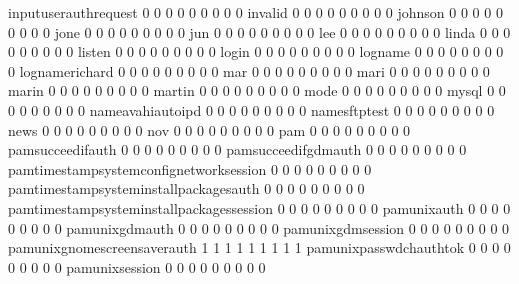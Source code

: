 \documentclass[compress,8pt]{beamer}
\begin{document}
\begin{frame}
\begin{Schunk}
  inputuserauthrequest                       0   0   0   0   0   0   0   0   0
  invalid                                    0   0   0   0   0   0   0   0   0
  johnson                                    0   0   0   0   0   0   0   0   0
  jone                                       0   0   0   0   0   0   0   0   0
  jun                                        0   0   0   0   0   0   0   0   0
  lee                                        0   0   0   0   0   0   0   0   0
  linda                                      0   0   0   0   0   0   0   0   0
  listen                                     0   0   0   0   0   0   0   0   0
  login                                      0   0   0   0   0   0   0   0   0
  logname                                    0   0   0   0   0   0   0   0   0
  lognamerichard                             0   0   0   0   0   0   0   0   0
  mar                                        0   0   0   0   0   0   0   0   0
  mari                                       0   0   0   0   0   0   0   0   0
  marin                                      0   0   0   0   0   0   0   0   0
  martin                                     0   0   0   0   0   0   0   0   0
  mode                                       0   0   0   0   0   0   0   0   0
  mysql                                      0   0   0   0   0   0   0   0   0
  nameavahiautoipd                           0   0   0   0   0   0   0   0   0
  namesftptest                               0   0   0   0   0   0   0   0   0
  news                                       0   0   0   0   0   0   0   0   0
  nov                                        0   0   0   0   0   0   0   0   0
  pam                                        0   0   0   0   0   0   0   0   0
  pamsucceedifauth                           0   0   0   0   0   0   0   0   0
  pamsucceedifgdmauth                        0   0   0   0   0   0   0   0   0
  pamtimestampsystemconfignetworksession     0   0   0   0   0   0   0   0   0
  pamtimestampsysteminstallpackagesauth      0   0   0   0   0   0   0   0   0
  pamtimestampsysteminstallpackagessession   0   0   0   0   0   0   0   0   0
  pamunixauth                                0   0   0   0   0   0   0   0   0
  pamunixgdmauth                             0   0   0   0   0   0   0   0   0
  pamunixgdmsession                          0   0   0   0   0   0   0   0   0
  pamunixgnomescreensaverauth                1   1   1   1   1   1   1   1   1
  pamunixpasswdchauthtok                     0   0   0   0   0   0   0   0   0
  pamunixsession                             0   0   0   0   0   0   0   0   0

\end{Schunk}
\end{frame}
\end{document}
